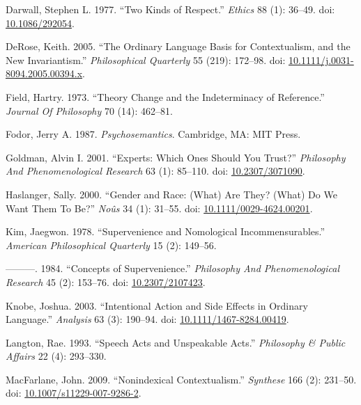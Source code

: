 \documentclass[
  10pt,
  letterpaper,
  DIV=11,
  numbers=noendperiod,
  twoside]{scrartcl}
\newlength{\cslhangindent}
\newenvironment{CSLReferences}[2] %
 {\begin{list}{}{%
  \setlength{\itemindent}{0pt}
  \setlength{\leftmargin}{0pt}
  \setlength{\parsep}{0pt}
  \ifodd #1
   \setlength{\leftmargin}{\cslhangindent}
   \setlength{\itemindent}{-1\cslhangindent}
  \fi
  \setlength{\itemsep}{#2\baselineskip}}}
 {\end{list}}
\begin{document}
\label{refs}
\begin{CSLReferences}{1}{0}
Darwall, Stephen L. 1977. {``Two Kinds of Respect.''} \emph{Ethics} 88
(1): 36--49. doi: \href{https://doi.org/10.1086/292054}{10.1086/292054}.

DeRose, Keith. 2005. {``The Ordinary Language Basis for Contextualism,
and the New Invariantism.''} \emph{Philosophical Quarterly} 55 (219):
172--98. doi:
\href{https://doi.org/10.1111/j.0031-8094.2005.00394.x}{10.1111/j.0031-8094.2005.00394.x}.

Field, Hartry. 1973. {``Theory Change and the Indeterminacy of
Reference.''} \emph{Journal Of Philosophy} 70 (14): 462--81.

Fodor, Jerry A. 1987. \emph{Psychosemantics}. Cambridge, MA: MIT Press.

Goldman, Alvin I. 2001. {``Experts: Which Ones Should You Trust?''}
\emph{Philosophy And Phenomenological Research} 63 (1): 85--110. doi:
\href{https://doi.org/10.2307/3071090}{10.2307/3071090}.

Haslanger, Sally. 2000. {``Gender and Race: (What) Are They? (What) Do
We Want Them To Be?''} \emph{Noûs} 34 (1): 31--55. doi:
\href{https://doi.org/10.1111/0029-4624.00201}{10.1111/0029-4624.00201}.

Kim, Jaegwon. 1978. {``Supervenience and Nomological
Incommensurables.''} \emph{American Philosophical Quarterly} 15 (2):
149--56.

---------. 1984. {``Concepts of Supervenience.''} \emph{Philosophy And
Phenomenological Research} 45 (2): 153--76. doi:
\href{https://doi.org/10.2307/2107423}{10.2307/2107423}.

Knobe, Joshua. 2003. {``Intentional Action and Side Effects in Ordinary
Language.''} \emph{Analysis} 63 (3): 190--94. doi:
\href{https://doi.org/10.1111/1467-8284.00419}{10.1111/1467-8284.00419}.

Langton, Rae. 1993. {``Speech Acts and Unspeakable Acts.''}
\emph{Philosophy \& Public Affairs} 22 (4): 293--330.

MacFarlane, John. 2009. {``Nonindexical Contextualism.''}
\emph{Synthese} 166 (2): 231--50. doi:
\href{https://doi.org/10.1007/s11229-007-9286-2}{10.1007/s11229-007-9286-2}.


\end{CSLReferences}
\end{document}
